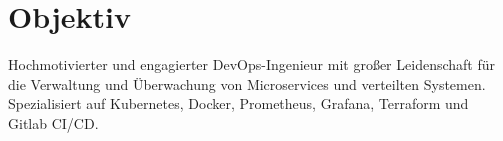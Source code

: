 \documentclass[../main.tex]{subfiles}
\begin{document}
  \section{Objektiv}
  \begin{category}
    \citembullet  
    Hochmotivierter und engagierter DevOps-Ingenieur mit großer 
    Leidenschaft für die Verwaltung und Überwachung von Microservices 
    und verteilten Systemen. Spezialisiert auf Kubernetes, Docker, 
    Prometheus, Grafana, Terraform und Gitlab CI/CD.
  \end{category}
\end{document}
